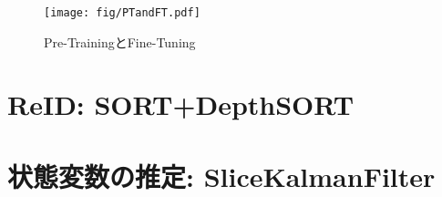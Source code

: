 \begin{figure}[t]
    \centering    
    \texttt{[image: fig/PTandFT.pdf]}
    \caption{Pre-TrainingとFine-Tuning}
    \label{fig:PTandFT}
\end{figure}

\section{ReID: SORT+DepthSORT}

\section{状態変数の推定: SliceKalmanFilter}